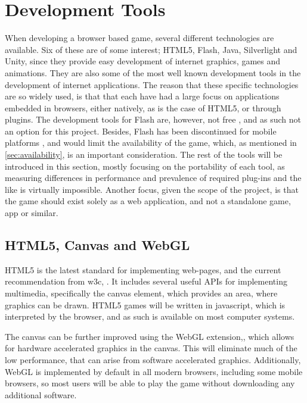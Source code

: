 \section{Development Tools}
\label{sec:tools}

When developing a browser based game, several different technologies are available.
Six of these are of some interest; HTML5, Flash, Java, Silverlight and Unity, since they provide easy development of internet graphics, games and animations.
They are also some of the most well known development tools in the development of internet applications. The reason that these specific technologies are so widely used, is that that each have had a large focus on applications embedded in browsers, either natively, as is the case of HTML5, or through plugins.
The development tools for Flash are, however, not free \cite{adobe13}, and as such not an option for this project.
Besides, Flash has been discontinued for mobile platforms \cite{adobe12}, and would limit the availability of the game, which, as mentioned in \autoref{sec:availability}, is an important consideration.
The rest of the tools will be introduced in this section, mostly focusing on the portability of each tool, as measuring differences in performance and prevalence of required plug-ins and the like is virtually impossible.
Another focus, given the scope of the project, is that the game should exist solely as a web application, and not a standalone game, app or similar.

\subsection{HTML5, Canvas and WebGL}
HTML5 is the latest standard for implementing web-pages, and the current recommendation from \ac{w3c}, \cite{html513}.
It includes several useful APIs for implementing multimedia, specifically the canvas element, which provides an area, where graphics can be drawn.
HTML5 games will be written in javascript, which is interpreted by the browser, and as such is available on most computer systems.\newline

The canvas can be further improved using the WebGL extension,\cite{khronos13}, which allows for hardware accelerated graphics in the canvas. 
This will eliminate much of the low performance, that can arise from software accelerated graphics.
Additionally, WebGL is implemented by default in all modern browsers, including some mobile browsers, so most users will be able to play the game without downloading any additional software.

